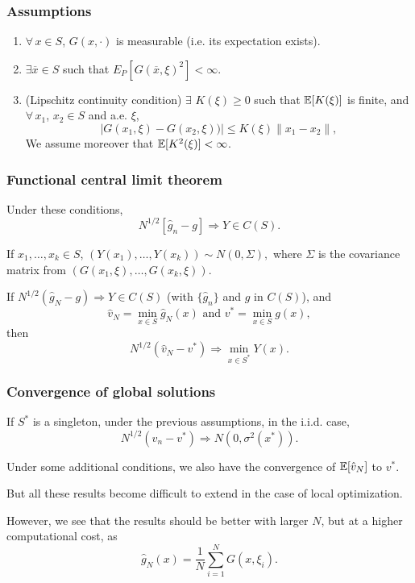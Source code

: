 \documentclass[aspectratio=169]{beamer}
\begin{document}
\begin{frame}
\frametitle{Assumptions}

\begin{enumerate}
\item
$\forall\, x \in S$, $G(x,\cdot)$ is measurable (i.e. its expectation exists).
\item
$\exists \overline{x} \in S$ such that $E_P[G(\overline{x}, \xi)^2] < \infty$.
\item
(Lipschitz continuity condition) 
$\exists$ $K(\xi) \geq 0$ such that ${\mathbb{E}}[K(\xi)]$ is finite, and
$\forall\, x_1$, $x_2 \in S$ and a.e. $\xi$,
\[
| G(x_1, \xi) - G(x_2, \xi) )| \leq K(\xi) \| x_1 - x_2\|,
\]
We assume moreover that ${\mathbb{E}}[K^2(\xi)] < \infty$.%
\end{enumerate}

\end{frame}

\begin{frame}
\frametitle{Functional central limit theorem}

Under these conditions,
\[
N^{1/2} [\hat{g}_n - g] \Rightarrow Y \in C(S).
\]

\mbox{}

If $x_1,\ldots,x_k \in S$, %
$
(Y(x_1),\ldots,Y(x_k)) \sim N(0, \Sigma),
$
where $\Sigma$ is the covariance matrix from $(G(x_1, \xi), \ldots, G(x_k, \xi))$.

\mbox{}

If $N^{1/2}(\hat{g}_N - g) \Rightarrow Y \in C(S)$ (with $\lbrace \hat{g}_n \rbrace$ and $g$ in $C(S)$), and
\[
\hat{v}_N = \min_{x \in S} \hat{g}_N(x) \mbox{ and } v^*= \min_{x \in S} g(x),
\]
then
\[
N^{1/2}(\hat{v}_N - v^*) \Rightarrow \min_{x \in S^*} Y(x).
\]

\end{frame}

\begin{frame}
\frametitle{Convergence of global solutions}

If $S^*$ is a singleton, under the previous assumptions, in the i.i.d. case,
\[
N^{1/2}(\hat{v}_n - v^*) \Rightarrow N(0, \sigma^2(x^*) ).
\]

\mbox{}

Under some additional conditions, we also have the convergence of ${\mathbb{E}}[\hat{v}_N]$ to $v^*$.

\mbox{}

But all these results become difficult to extend in the case of local optimization.

\mbox{}

However, we see that the results should be better with larger $N$, but at a higher computational cost, as
$$
\hat{g}_N(x) = \frac{1}{N} \sum_{i = 1}^N G (x, \xi_i).
$$

\end{frame}
\end{document}
